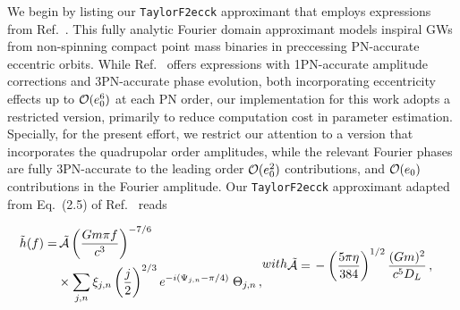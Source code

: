 \documentclass[aps,prd,twocolumn,superscriptaddress,groupedaddress,nofootinbib,showpacs,eqsecnum,useAms]{revtex4-2}
\begin{document}
We begin by listing our \texttt{TaylorF2ecck} approximant that employs 
expressions from Ref.~\cite{TGHH}. This fully analytic Fourier domain approximant models inspiral GWs from non-spinning compact point mass binaries in preccessing PN-accurate eccentric orbits. 
While Ref.~\cite{TGHH} offers expressions with 1PN-accurate amplitude corrections and 3PN-accurate phase evolution, both incorporating eccentricity effects up to ${\cal O}(e_0^6)$ at each PN order, our implementation for this work adopts a restricted version, primarily to reduce computation cost in parameter estimation.
Specially,
for the present effort, we restrict our attention to a version that incorporates the quadrupolar order amplitudes,
while the relevant  Fourier phases are fully 3PN-accurate
to the leading order ${\cal O}(e_0^2)$ contributions,
and ${\cal O}(e_0)$ contributions in the Fourier amplitude.
 Our \texttt{TaylorF2ecck} approximant adapted from Eq.~(2.5) of Ref.~\cite{TGHH} reads

\begin{subequations}
\begin{align}
\tilde{h}(f) = & \, {\cal \tilde{A}} \left(\frac{Gm\pi f}{c^3}\right)^{-7/6} \notag \\ 
& \times \sum_{j,n} \xi_{j,n} \left(\frac{j}{2}\right)^{2/3} e^{-i(\Psi_{j,n}-\pi/4)} \; \Theta_{j,n}\,,
\end{align}
with
\begin{align}
{\cal \tilde{A}} = &  \, -\left( \frac{5\pi \eta}{384} \right)^{1/2} \frac{(G m)^2}{c^5 D_L}\,,
\end{align}
\end{subequations}
\end{document}

